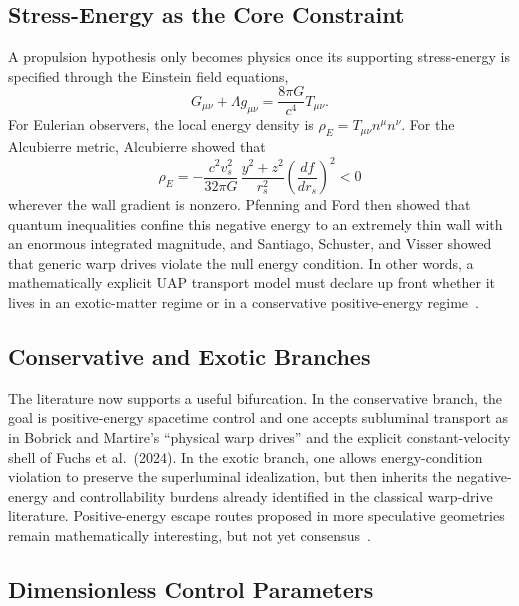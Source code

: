 \documentclass[aps,prd,twocolumn,superscriptaddress,nofootinbib,floatfix]{revtex4-2}
\begin{document}
\subsection{Stress-Energy as the Core Constraint}\label{sec:stress-energy-core}

A propulsion hypothesis only becomes physics once its supporting stress-energy
is specified through the Einstein field equations,
\begin{equation}
G_{\mu\nu} + \Lambda g_{\mu\nu} = \frac{8\pi G}{c^4} T_{\mu\nu}.
\label{eq:s09-einstein}
\end{equation}
For Eulerian observers, the local energy density is
$\rho_E = T_{\mu\nu}n^\mu n^\nu$. For the Alcubierre metric, Alcubierre showed
that
\begin{equation}
\rho_E = -\frac{c^{2}v_s^{2}}{32\pi G}\,\frac{y^{2}+z^{2}}{r_s^{2}}
\left(\frac{df}{dr_s}\right)^{2} < 0
\label{eq:s09-rhoE}
\end{equation}
wherever the wall gradient is nonzero. Pfenning and Ford then showed that quantum
inequalities confine this negative energy to an extremely thin wall with an
enormous integrated magnitude, and Santiago, Schuster, and Visser showed that
generic warp drives violate the null energy condition. In other words, a
mathematically explicit UAP transport model must declare up front whether it lives
in an exotic-matter regime or in a conservative positive-energy
regime~\cite{Alcubierre1994,PfenningFord1997,SantiagoVisser2022}.

\subsection{Conservative and Exotic Branches}\label{sec:branches}

The literature now supports a useful bifurcation. In the conservative branch,
the goal is positive-energy spacetime control and one accepts subluminal
transport as in Bobrick and Martire's ``physical warp drives'' and the explicit
constant-velocity shell of Fuchs et al.~(2024). In the exotic branch, one allows
energy-condition violation to preserve the superluminal idealization, but then
inherits the negative-energy and controllability burdens already identified in the
classical warp-drive literature. Positive-energy escape routes proposed in more
speculative geometries remain mathematically interesting, but not yet
consensus~\cite{BobrickMartire2021,FellHeisenberg2021,Fuchs2024}.

\subsection{Dimensionless Control Parameters}\label{sec:dimensionless-parameters}
\end{document}
